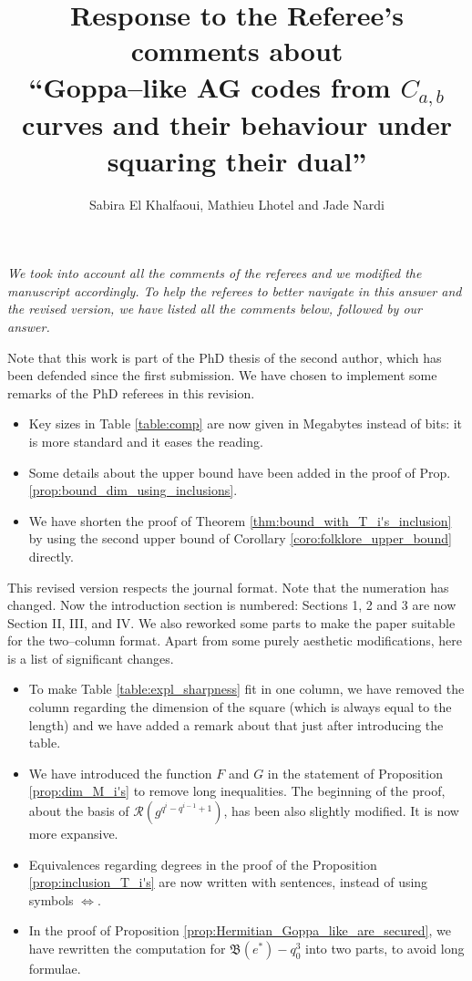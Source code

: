 \documentclass[12pt,a4paper]{amsart}
\title[Goppa--like AG codes from $C_{a,b}$ curves and their behaviour under squaring their dual]{Response to the Referee's comments about  \\ ``Goppa--like AG codes from $C_{a,b}$ curves and their behaviour under squaring their dual''}
\author{Sabira El Khalfaoui, Mathieu Lhotel and Jade Nardi}
\begin{document}
\maketitle

{\itshape
We took into account all the comments of the referees and we modified the manuscript accordingly. To help the referees to better navigate in this answer and the revised version, we have listed all the comments below, followed by our answer.

Note that this work is part of the PhD thesis of the second author, which has been defended since the first submission. We have chosen to implement some remarks of the PhD referees in this revision.
\begin{itemize}
	\item Key sizes in Table \ref{table:comp} are now  given in Megabytes instead of bits: it is more standard and it eases the reading.
	\item Some details about the upper bound have been added in the proof of Prop. \ref{prop:bound_dim_using_inclusions}.
	\item We have shorten the proof of Theorem \ref{thm:bound_with_T_i's_inclusion} by using the second upper bound of Corollary \ref{coro:folklore_upper_bound} directly.
\end{itemize}

\medskip

This revised version respects the journal format. Note that the numeration has changed. Now the introduction section is numbered: Sections 1, 2 and 3 are now Section II, III, and IV. We also reworked some parts to make the paper suitable for the two--column format. Apart from some purely aesthetic modifications, here is a list of significant changes.
\begin{itemize}
	\item To make Table \ref{table:expl_sharpness} fit in one column, we have removed the column regarding the dimension of the square (which is always equal to the length) and we have added a remark about that just after introducing the table.
	\item We have introduced the function $F$ and $G$ in the statement of Proposition \ref{prop:dim_M_i's} to remove long inequalities. The beginning of the proof, about the basis of $\mathcal{R}\left(g^{q^i-q^{i-1}+1}\right)$, has been also slightly modified. It is now more expansive. 
	\item Equivalences regarding degrees in the proof of the Proposition \ref{prop:inclusion_T_i's} are now written with sentences, instead of using symbols $\Leftrightarrow$.
	\item In the proof of Proposition \ref{prop:Hermitian_Goppa_like_are_secured}, we have rewritten the computation for $\mathfrak{B}(e^*)-q_0^3$ into two parts, to avoid long formulae.
\end{itemize}

}
\end{document}
